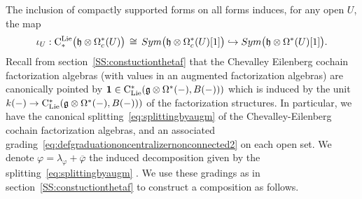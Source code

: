 \documentclass[11pt]{amsart}
\numberwithin{equation}{section}
\begin{document}
The inclusion  of compactly supported forms on all forms induces, for any open $U$,  the  map
\begin{equation}
 \label{eq:incofcpctforms} 
\iota_U: {\rm C}^{\rm Lie}_*\big(\mathfrak h \otimes \Omega^*_c(U)\big) \, \cong \, 
Sym\big( \mathfrak h\otimes  \Omega^*_c (U) [1]\big) \hookrightarrow  
Sym\big( \mathfrak h\otimes  \Omega^* (U) [1]\big).
\end{equation}
Recall from section~\ref{SS:constuctionthetaf} that the Chevalley Eilenberg cochain factorization algebras (with values in an augmented factorization 
algebras) 
are canonically pointed  by $\mathbf{1}\in {\rm C}_{\rm Lie}^*(\mathfrak g\otimes \Omega^*(-), B(-)) )$ which is induced by 
the unit $k(-)\to {\rm C}_{\rm Lie}^*(\mathfrak g\otimes \Omega^*(-), B(-)) )$
 of the factorization structures.  In particular, we have the canonical splitting~\eqref{eq:splittingbyaugm} 
of the  Chevalley-Eilenberg cochain factorization algebras, and an associated grading~\eqref{eq:defgraduationoncentralizernonconnected2} on each open
set. We denote $\varphi= \lambda_\varphi +\overline{\varphi}$ the induced decomposition given by the splitting~\eqref{eq:splittingbyaugm} . 
We use these gradings as in section~\ref{SS:constuctionthetaf} to construct a composition as follows. 
\end{document}
